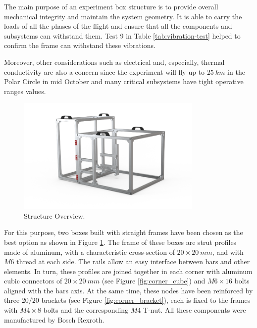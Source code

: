The main purpose of an experiment box structure is to provide overall mechanical integrity and maintain the system geometry. It is able to carry the loads of all the phases of the flight and ensure that all the components and subsystems can withstand them. Test 9 in Table \ref{tab:vibration-test} helped to confirm the frame can withstand these vibrations.

Moreover, other considerations such as electrical and, especially, thermal conductivity are also a concern since the experiment will fly up to $25\ km$ in the Polar Circle in mid October and many critical subsystems have tight operative ranges values.

 \begin{figure}[H]
     \centering
     \includegraphics[width=0.8\textwidth]{4-experiment-design/img/Mechanical/structure.png}
     \caption{Structure Overview.}
     \label{fig:structure}
\end{figure}

For this purpose, two boxes built with straight frames have been chosen as the best option as shown in Figure \ref{fig:structure}. The frame of these boxes are strut profiles made of aluminum, with a characteristic cross-section of $20\times20\ mm$, and with $M6$ thread at each side. The rails allow an easy interface between bars and other elements. In turn, these profiles are joined together in each corner with aluminum cubic connectors of $20\times20\ mm$ (see Figure \ref{fig:corner_cube}) and $M6\times16$ bolts aligned with the bars axis. At the same time, these nodes have been reinforced by three $20/20$ brackets (see Figure \ref{fig:corner_bracket}), each is fixed to the frames with $M4\times8$ bolts and the corresponding $M4$ T-nut. All these components were manufactured by Bosch Rexroth.

